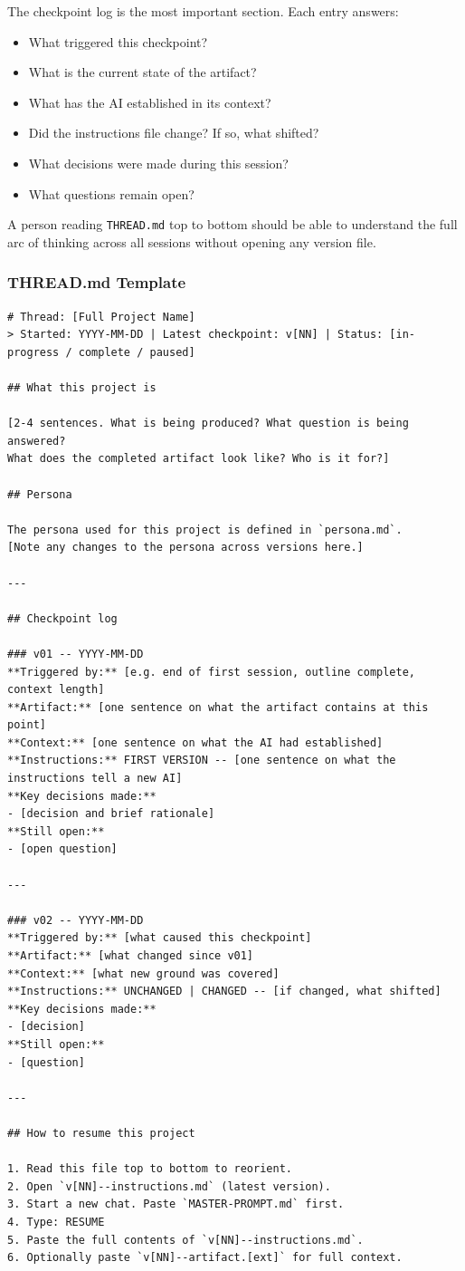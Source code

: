 \documentclass[12pt,letterpaper]{article}
\begin{document}
The checkpoint log is the most important section. Each entry answers:

\begin{itemize}
  \item What triggered this checkpoint?
  \item What is the current state of the artifact?
  \item What has the AI established in its context?
  \item Did the instructions file change? If so, what shifted?
  \item What decisions were made during this session?
  \item What questions remain open?
\end{itemize}

A person reading \texttt{THREAD.md} top to bottom should be able to understand
the full arc of thinking across all sessions without opening any version file.

\subsubsection{THREAD.md Template}

\begin{lstlisting}
# Thread: [Full Project Name]
> Started: YYYY-MM-DD | Latest checkpoint: v[NN] | Status: [in-progress / complete / paused]

## What this project is

[2-4 sentences. What is being produced? What question is being answered?
What does the completed artifact look like? Who is it for?]

## Persona

The persona used for this project is defined in `persona.md`.
[Note any changes to the persona across versions here.]

---

## Checkpoint log

### v01 -- YYYY-MM-DD
**Triggered by:** [e.g. end of first session, outline complete, context length]
**Artifact:** [one sentence on what the artifact contains at this point]
**Context:** [one sentence on what the AI had established]
**Instructions:** FIRST VERSION -- [one sentence on what the instructions tell a new AI]
**Key decisions made:**
- [decision and brief rationale]
**Still open:**
- [open question]

---

### v02 -- YYYY-MM-DD
**Triggered by:** [what caused this checkpoint]
**Artifact:** [what changed since v01]
**Context:** [what new ground was covered]
**Instructions:** UNCHANGED | CHANGED -- [if changed, what shifted]
**Key decisions made:**
- [decision]
**Still open:**
- [question]

---

## How to resume this project

1. Read this file top to bottom to reorient.
2. Open `v[NN]--instructions.md` (latest version).
3. Start a new chat. Paste `MASTER-PROMPT.md` first.
4. Type: RESUME
5. Paste the full contents of `v[NN]--instructions.md`.
6. Optionally paste `v[NN]--artifact.[ext]` for full context.
\end{lstlisting}
\end{document}
